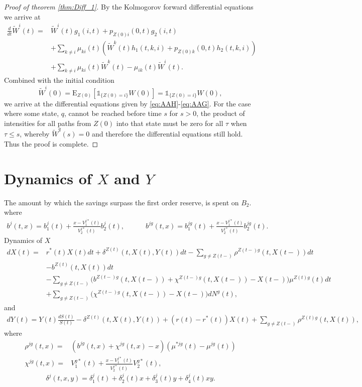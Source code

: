 \documentclass[12pt]{article}
\newcommand{\E}{\text{E}}
\newcommand{\indic}[1]{\mathds{1}_{ \{ #1 \} }}
\theoremstyle{my_thm}
\begin{document}
\begin{proof}[Proof of theorem \ref{thm:Diff_1}]
By the Kolmogorov forward differential equations we arrive at
\begin{align*}
\frac{d}{dt}\tilde{W}^i(t)=&
 \tilde{W}^i(t)g_1(i,t)+p_{Z(0)i}(0,t)g_2(i,t)\\
&+
\sum_{k \neq i} \mu_{ki}(t) \left( \tilde{W}^k(t) h_1(t,k,i) + p_{Z(0)k}(0,t)h_2(t,k,i) \right)
\\
&+
\sum_{k \neq i} \mu_{ki}(t) \tilde{W}^k(t)-\mu_{ik}(t)\tilde{W}^i(t).
\end{align*}
Combined with the initial condition
$$
\tilde{W}^i(0)=\E_{Z(0)}[\indic{Z(0)=i}W(0)]=\indic{Z(0)=i}W(0),
$$
we arrive at the differential equations given by \eqref{eq:AAH}-\eqref{eq:AAG}. For the case where some state, $q$, cannot be reached before time $s$ for $s>0$, the product of intensities for all paths from $Z(0)$ into that state must be zero for all $\tau$ when $\tau \leq s$, whereby $\tilde{W}^q(s)=0$ and therefore the differential equations still hold. Thus the proof is complete.
\end{proof}

\section{Dynamics of $X$ and $Y$}
\label{seq:Dyn}
The amount by which the savings surpass the first order reserve, is spent on $B_2$. 
where
\begin{gather*}
b^j(t,x)=b_1^j(t)+\frac{x-V_1^{j*}(t)}{V_2^{j*}(t)}b^j_2(t),
\qquad \quad
b^{jg}(t,x)=b_1^{jg}(t)+\frac{x-V_1^{j*}(t)}{V_2^{j*}(t)}b^{jg}_2(t).
\end{gather*}
Dynamics of $X$
\begin{align*}
dX(t)=&
r^*(t)X(t)dt
 +\delta^{Z(t)}(t,X(t),Y(t))  dt- \sum_{g \neq Z(t-)} \rho^{Z(t-)g}(t,X(t-)) dt
 \nonumber 
\\
\nonumber
&- b^{Z(t)}(t,X(t)) dt
\\
&- \sum_{g\neq Z(t-)}\bigg(b^{Z(t-)g}(t,X(t-))+\chi^{Z(t-)g}(t,X(t-))-X(t-) \bigg) \mu^{Z(t)g}(t)dt
\\
&+ \sum_{g\neq Z(t-)}\bigg(\chi^{Z(t-)g}(t,X(t-))-X(t-) \bigg)  dN^g(t),
\end{align*}
and
\begin{align*}
dY(t)=Y(t)\frac{dS(t)}{S(t)}-\delta^{Z(t)}(t,X(t),Y(t)) + (r(t)-r^*(t)) X(t) + \sum_{g \neq Z(t-)} \rho^{Z(t)g}(t,X(t)),
\end{align*}
where
\begin{align*}
\rho^{jg}(t,x)=&(b^{jg}(t,x)+ \chi^{jg}(t,x)-x) (\mu^{*jg}(t)-\mu^{jg}(t))
\\
\chi^{jg}(t,x)=& V^{g*}_1(t) + \frac{x-V^{j*}_1(t)}{V^{j*}_2(t)}V^{g*}_2(t),
\end{align*}
\begin{equation}
\delta^j(t,x,y)=\delta_1^j(t)+\delta_2^j(t)x+\delta_3^j(t)y+\delta_4^j(t)xy.
\end{equation}
\end{document}
